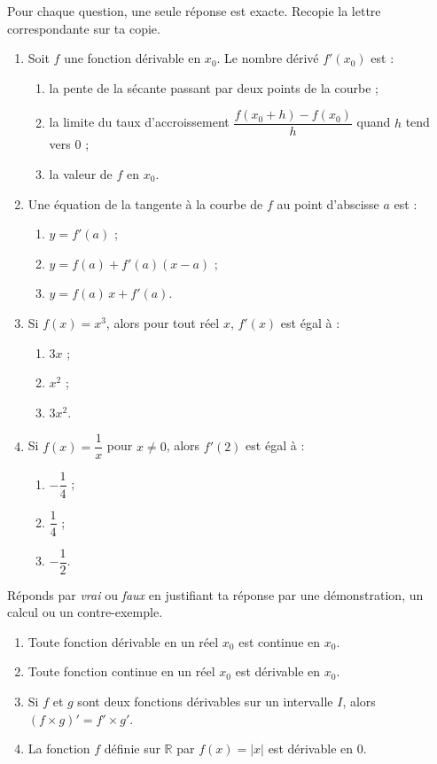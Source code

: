 \documentclass[11pt]{article}
\begin{document}
\begin{exercice}
Pour chaque question, une seule réponse est exacte. Recopie la lettre correspondante sur ta copie.
\begin{enumerate}
\item Soit $f$ une fonction dérivable en $x_0$. Le nombre dérivé $f'(x_0)$ est :
\begin{enumerate}
\item la pente de la sécante passant par deux points de la courbe ;
\item la limite du taux d'accroissement $\dfrac{f(x_0+h)-f(x_0)}{h}$ quand $h$ tend vers $0$ ;
\item la valeur de $f$ en $x_0$.
\end{enumerate}
\item Une équation de la tangente à la courbe de $f$ au point d'abscisse $a$ est :
\begin{enumerate}
\item $y=f'(a)$ ;
\item $y=f(a)+f'(a)(x-a)$ ;
\item $y=f(a)\,x+f'(a)$.
\end{enumerate}
\item Si $f(x)=x^3$, alors pour tout réel $x$, $f'(x)$ est égal à :
\begin{enumerate}
\item $3x$ ;
\item $x^2$ ;
\item $3x^2$.
\end{enumerate}
\item Si $f(x)=\dfrac{1}{x}$ pour $x\neq 0$, alors $f'(2)$ est égal à :
\begin{enumerate}
\item $-\dfrac{1}{4}$ ;
\item $\dfrac{1}{4}$ ;
\item $-\dfrac{1}{2}$.
\end{enumerate}
\end{enumerate}
\end{exercice}

\begin{exercice}
Réponds par \emph{vrai} ou \emph{faux} en justifiant ta réponse par une démonstration, un calcul ou un contre-exemple.
\begin{enumerate}
\item Toute fonction dérivable en un réel $x_0$ est continue en $x_0$.
\item Toute fonction continue en un réel $x_0$ est dérivable en $x_0$.
\item Si $f$ et $g$ sont deux fonctions dérivables sur un intervalle $I$, alors $(f\times g)'=f'\times g'$.
\item La fonction $f$ définie sur $\mathbb{R}$ par $f(x)=|x|$ est dérivable en $0$.
\end{enumerate}
\end{exercice}
\end{document}
